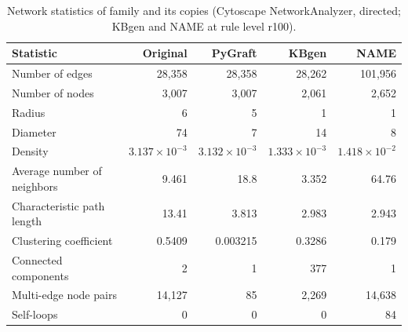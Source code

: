 \begin{table}[t]
\centering
\caption{Network statistics of family and its copies (Cytoscape NetworkAnalyzer, directed; KBgen and NAME at rule level r100).}
\label{tab:cytoscape_family}
\begin{tabular}{lrrrr}
\toprule
Statistic & Original & PyGraft & KBgen & NAME \\
\midrule
Number of edges & 28{,}358 & 28{,}358 & 28{,}262 & 101{,}956 \\
Number of nodes & 3{,}007 & 3{,}007 & 2{,}061 & 2{,}652 \\
Radius & 6 & 5 & 1 & 1 \\
Diameter & 74 & 7 & 14 & 8 \\
Density & $3.137\times10^{-3}$ & $3.132\times10^{-3}$ & $1.333\times10^{-3}$ & $1.418\times10^{-2}$ \\
Average number of neighbors & 9.461 & 18.8 & 3.352 & 64.76 \\
Characteristic path length & 13.41 & 3.813 & 2.983 & 2.943 \\
Clustering coefficient & 0.5409 & 0.003215 & 0.3286 & 0.179 \\
Connected components & 2 & 1 & 377 & 1 \\
Multi-edge node pairs & 14{,}127 & 85 & 2{,}269 & 14{,}638 \\
Self-loops & 0 & 0 & 0 & 84 \\
\bottomrule
\end{tabular}
\end{table}
